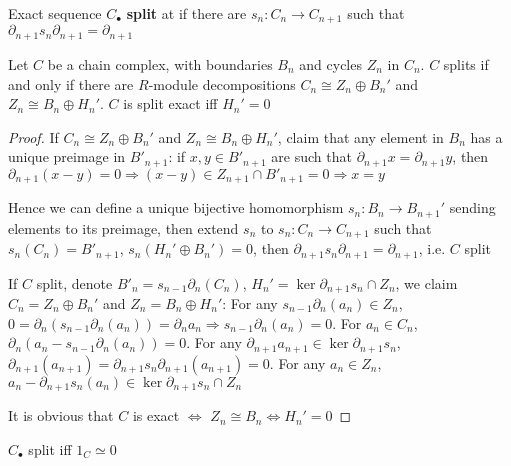\documentclass[../main.tex]{subfiles}
\begin{document}
\begin{definition}
Exact sequence $C_\bullet$ \textbf{split} at if there are $s_n:C_n\to C_{n+1}$ such that $\partial_{n+1}s_n\partial_{n+1}=\partial_{n+1}$
\end{definition}

\begin{lemma}\label{Equivalent conditions for split and split exact}
Let $C$ be a chain complex, with boundaries $B_n$ and cycles $Z_n$ in $C_n$. $C$ splits if and only if there are $R$-module decompositions $C_n\cong Z_n\oplus B_n'$ and $Z_n\cong B_n\oplus H_n'$. $C$ is split exact iff $H_n'=0$
\end{lemma}

\begin{proof}
If $C_n\cong Z_n\oplus B_n'$ and $Z_n\cong B_n\oplus H_n'$, claim that any element in $B_n$ has a unique preimage in $B'_{n+1}$: if $x,y\in B'_{n+1}$ are such that $\partial_{n+1}x=\partial_{n+1}y$, then $\partial_{n+1}(x-y)=0\Rightarrow (x-y)\in Z_{n+1}\cap B'_{n+1}=0\Rightarrow x=y$ \par
Hence we can define a unique bijective homomorphism $s_n:B_n\to B_{n+1}'$ sending elements to its preimage, then extend $s_n$ to $s_n:C_n\to C_{n+1}$ such that $s_n(C_n)= B'_{n+1}$, $s_{n}(H_n'\oplus B_n')=0$, then $\partial_{n+1}s_n\partial_{n+1}=\partial_{n+1}$, i.e. $C$ split \par
If $C$ split, denote $B'_n=s_{n-1}\partial_n(C_n)$, $H_n'=\ker \partial_{n+1}s_n\cap Z_n$, we claim $C_n= Z_n\oplus B_n'$ and $Z_n=B_n\oplus H_n'$: For any $s_{n-1}\partial_n(a_n)\in Z_n$, $0=\partial_n(s_{n-1}\partial_n(a_n))=\partial_na_n\Rightarrow s_{n-1}\partial_n(a_n)=0$. For $a_n\in C_n$, $\partial_n(a_n-s_{n-1}\partial_n(a_n))=0$. For any $\partial_{n+1}a_{n+1}\in\ker \partial_{n+1}s_n$, $\partial_{n+1}(a_{n+1})=\partial_{n+1}s_n\partial_{n+1}(a_{n+1})=0$. For any $a_n\in Z_n$, $a_n-\partial_{n+1}s_n(a_n)\in\ker \partial_{n+1}s_n\cap Z_n$ \par
It is obvious that $C$ is exact $\Leftrightarrow$ $Z_n\cong B_n\Leftrightarrow H_n'=0$
\end{proof}

\begin{lemma}\label{Splic iff nullhomotopic}
$C_\bullet$ split iff $1_C\simeq 0$
\end{lemma}
\end{document}
